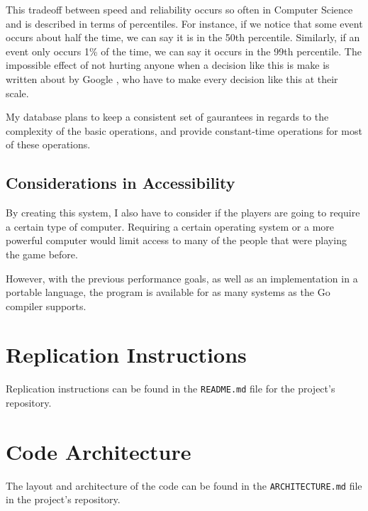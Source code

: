 \documentclass[10pt,twocolumn]{article}
\begin{document}
This tradeoff between speed and reliability occurs so often in Computer Science 
and is described in terms of percentiles. For instance, if we notice that some
event occurs about half the time, we can say it is in the 50th percentile.
Similarly, if an event only occurs 1\% of the time, we can say it occurs in the
99th percentile. The impossible effect of not hurting anyone when a decision
like this is make is written about by Google \cite{dean2013tail}, who have to make every
decision like this at their scale.

My database plans to keep a consistent set of gaurantees in regards to the
complexity of the basic operations, and provide constant-time operations for
most of these operations.

\subsection{Considerations in Accessibility}

By creating this system, I also have to consider if the players are going to
require a certain type of computer. Requiring a certain operating system or a
more powerful computer would limit access to many of the people that were
playing the game before.

However, with the previous performance goals, as well as an implementation in a
portable language, the program is available for as many systems as the Go
compiler supports.

\appendix

\section{Replication Instructions}

Replication instructions can be found in the \verb|README.md| file for the
project's repository.

\section{Code Architecture}

The layout and architecture of the code can be found in the
\verb|ARCHITECTURE.md| file in the project's repository.

\printbibliography
\end{document}
